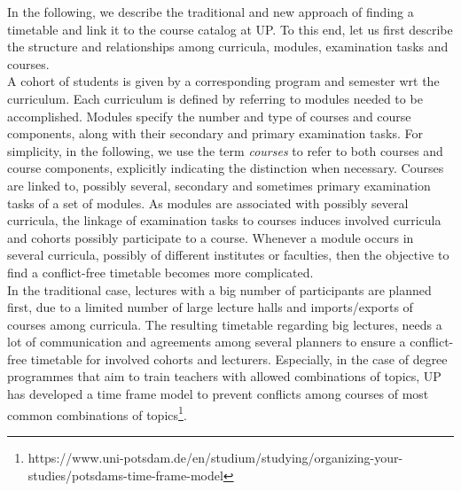 \documentclass{easychair}
\newcommand{\UP}{UP}
\begin{document}
  In the following, we describe the traditional and new approach of finding a timetable and link it to the course catalog at \UP{}. 
  To this end, let us first describe the structure and relationships among curricula, modules, examination tasks and courses. \\
  A cohort of students is given by a corresponding program and semester wrt the curriculum. 
  Each curriculum is defined by referring to modules needed to be accomplished. 
  Modules specify the number and type of courses and course components, along with their secondary and primary examination tasks. 
  For simplicity, in the following, we use the term \textit{courses} to refer to both courses and course components, explicitly indicating the distinction when necessary. 
  Courses are linked to, possibly several, secondary and sometimes primary examination tasks of a set of modules. 
  As modules are associated with possibly several curricula, the linkage of examination tasks to courses induces involved curricula and cohorts possibly participate to a course. 
  Whenever a module occurs in several curricula, possibly of different institutes or faculties, then the objective to find a conflict-free timetable becomes more complicated. \\
  In the traditional case, lectures with a big number of participants are planned first, due to a limited number of large lecture halls and imports/exports of courses among curricula. 
  The resulting timetable regarding big lectures, needs a lot of communication and agreements among several planners to ensure a conflict-free timetable for involved cohorts and lecturers. 
  Especially, in the case of degree programmes that aim to train teachers with allowed combinations of topics, \UP{} has developed a time frame model to prevent conflicts among courses of most common combinations of topics\footnote{https://www.uni-potsdam.de/en/studium/studying/organizing-your-studies/potsdams-time-frame-model}.
\end{document}
